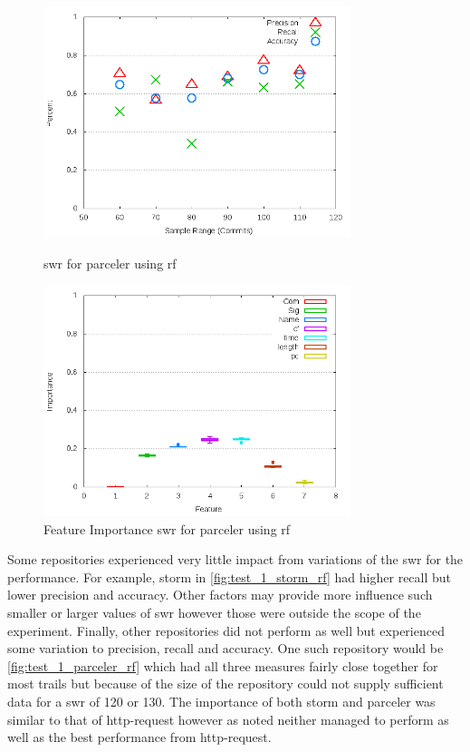 \begin{figure}[!t]
    \centering
        \includegraphics[width=0.8\textwidth]{images/rf/test_1/parceler_sample_range}
        \caption{\gls{swr} for parceler using \gls{rf}}
        \label{fig:test_1_parceler_rf}

    \includegraphics[width=0.8\textwidth]{images/rf/test_1/parceler_importance}
        \caption{Feature Importance \gls{swr} for parceler using \gls{rf}}
        \label{fig:test_1_parceler_rf_importance}
\end{figure}

Some repositories experienced very little impact from variations of the \gls{swr} for the performance. For example, storm in \autoref{fig:test_1_storm_rf} had higher recall but lower precision and accuracy. Other factors may provide more influence such smaller or larger values of \gls{swr} however those were outside the scope of the experiment. Finally, other repositories did not perform as well but experienced some variation to precision, recall and accuracy. One such repository would be \autoref{fig:test_1_parceler_rf} which had all three measures fairly close together for most trails but because of the size of the repository could not supply sufficient data for a \gls{swr} of 120 or 130. The importance of both storm and parceler was similar to that of http-request however as noted neither managed to perform as well as the best performance from http-request.

